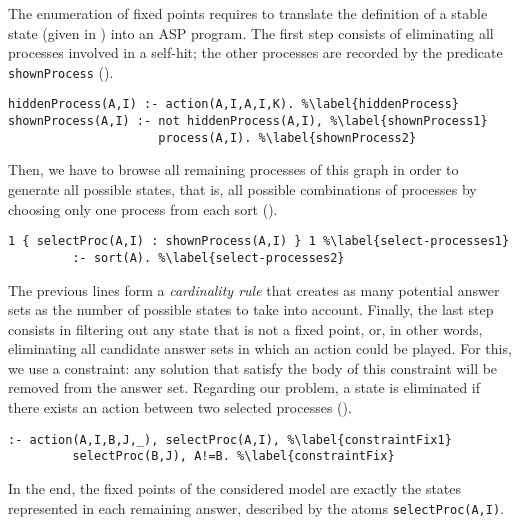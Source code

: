 The enumeration of fixed points requires to translate the definition of a stable state (given in )
into an ASP program.
The first step consists of eliminating all processes involved in a self-hit;
the other processes are recorded by the predicate \texttt{shownProcess} ().
\begin{lstlisting}
hiddenProcess(A,I) :- action(A,I,A,I,K). %\label{hiddenProcess}
shownProcess(A,I) :- not hiddenProcess(A,I), %\label{shownProcess1}
                     process(A,I). %\label{shownProcess2}
\end{lstlisting}
Then, we have to browse all remaining processes of this graph in order to generate all possible states,
that is, all possible combinations of processes by choosing only one process from each sort ().
\begin{lstlisting}
1 { selectProc(A,I) : shownProcess(A,I) } 1 %\label{select-processes1}
         :- sort(A). %\label{select-processes2}
\end{lstlisting}
The previous lines form a \emph{cardinality rule} that creates as many potential answer sets as the number of possible states
to take into account.
Finally, the last step consists in filtering out any state that is not a fixed point,
or, in other words, eliminating all candidate answer sets in which an action could be played. %
For this, we use a constraint:
any solution that satisfy the body of this constraint will be removed from the answer set.
Regarding our problem, a state is eliminated if there exists an action between two selected processes ().
\begin{lstlisting}
:- action(A,I,B,J,_), selectProc(A,I), %\label{constraintFix1}
         selectProc(B,J), A!=B. %\label{constraintFix}
\end{lstlisting}
In the end, the fixed points of the considered model are exactly the states represented in each remaining answer,
described by the atoms \texttt{selectProc(A,I)}.

